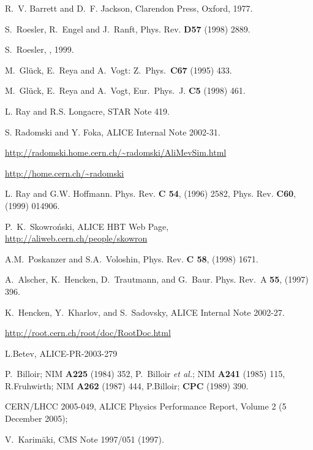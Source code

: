 \documentclass[12pt,a4paper,twoside]{article}
\begin{document}
{\begin{thebibliography}{99}
 R.~V. Barrett and D.~F. Jackson,  \newblock Clarendon Press, Oxford,
  1977.

 S.~Roesler, R.~Engel and J.~Ranft, \newblock
  Phys. Rev. \textbf{D57} (1998) 2889.

 S.~Roesler, ,
  1999.

 M.~Gl\"uck, E.~Reya and A.~Vogt: \newblock Z.\
  Phys.\ \textbf{C67} (1995) 433.

 M.~Gl\"uck, E.~Reya and A.~Vogt, \newblock Eur.\
  Phys.\ J. \textbf{C5} (1998) 461.

 L. Ray and R.S. Longacre, STAR Note 419.

   S. Radomski and Y. Foka, ALICE Internal Note 2002-31.

\bibitem{MC:TMEVSIM}
  \url{http://radomski.home.cern.ch/~radomski/AliMevSim.html}

 \url{http://home.cern.ch/~radomski}

 L. Ray and G.W. Hoffmann. Phys. Rev. \textbf{C
    54}, (1996) 2582, Phys. Rev. \textbf{C60}, (1999) 014906.

 P.~K.~Skowro\'nski, ALICE HBT Web Page,
  \url{http://aliweb.cern.ch/people/skowron}

 A.M.~Poskanzer and S.A.~Voloshin, Phys. Rev.
  \textbf{C 58}, (1998) 1671.

 A.~Alscher, K.~Hencken, D.~Trautmann, and
  G.~Baur.  \newblock Phys. Rev.~A \textbf{55}, (1997) 396.

 K.~Hencken, Y.~Kharlov, and S.~Sadovsky, ALICE
  Internal Note 2002-27.

  \url{http://root.cern.ch/root/doc/RootDoc.html}

 L.Betev, ALICE-PR-2003-279

 P.~Billoir; NIM \textbf{A225} (1984) 352,
  P.~Billoir {\it et al.};
  NIM \textbf{A241} (1985) 115, \\
  R.Fruhwirth; NIM \textbf{A262} (1987) 444, P.Billoir; \textbf{CPC}
  (1989) 390.

 CERN/LHCC 2005-049, ALICE Physics Performance Report,
  Volume 2 (5 December 2005);

 V.~Karim\"aki, CMS Note 1997/051 (1997).


\end{thebibliography}}
\end{document}
